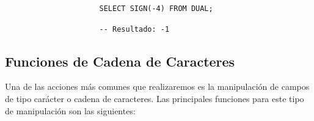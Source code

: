 \begin{itemize}
    \begin{figure}[H]
        \begin{tcolorbox}[sharp corners, colback=yellow!30, colframe=white!20]
            \scriptsize
            \begin{verbatim}


                SELECT SIGN(-4) FROM DUAL;

                -- Resultado: -1
            \end{verbatim}
        \end{tcolorbox}
    \end{figure}
    \end{itemize}


\subsection{Funciones de Cadena de Caracteres}
Una de las acciones más comunes que realizaremos es la manipulación de campos de tipo carácter o cadena de caracteres. Las principales funciones para este tipo de manipulación son las siguientes:

